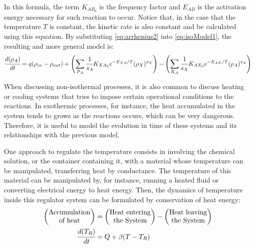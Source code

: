 \documentclass[a4paper,11pt]{book}
\numberwithin{figure}{chapter}
\numberwithin{equation}{chapter}
\numberwithin{table}{chapter}
\theoremstyle{definition}
\begin{document}
In this formula, the term $K_{AB_0}$ is the frequency factor and $E_{AB}$ is the activation energy necessary for such reaction to occur. Notice that, in the case that the temperature $T$ is constant, the kinetic rate is also constant and be calculated using this equation. By substituting \eqref{eq:arrhenius2} into \eqref{eq:isoModel1}, the resulting and more general model is:
\begin{equation} \label{eq:isoModel2}
		\cfrac{d (\rho_A)}{dt} = q (\rho_{in} - \rho_{out}) + \left( \sum_{\mathcal{P_A}} \cfrac{1}{s_A} K_{XA_0} e^{-E_{XA} / T} (\rho_X)^{s_{X}} \right) - \left(\sum_{\mathcal{R_A}} \cfrac{1}{s_X} K_{AX_0} e^{-E_{AX} / T} (\rho_A)^{s_{A}} \right)
\end{equation}

When discussing non-isothermal processes, it is also common to discuss heating or cooling systems that tries to impose certain operational conditions to the reactions. In exothermic processes, for instance, the heat accumulated in the system tends to grows as the reactions occurs, which can be very dangerous. Therefore, it is useful to model the evolution in time of these systems and its relationships with the previous model.

One approach to regulate the temperature consists in involving the chemical solution, or the container containing it, with a material whose temperature can be manipulated, transferring heat by conductance. The temperature of this material can be manipulated by, for instance, running a heated fluid or converting electrical energy to heat energy. Then, the dynamics of temperature inside this regulator system can be formulated by conservation of heat energy:
\begin{equation} \label{eq:jacket01}
\begin{split}
	\begin{pmatrix}
		\text{Accumulation} \\ \text{of heat}
	\end{pmatrix} &= \begin{pmatrix}
		\text{Heat entering} \\ \text{the System}
	\end{pmatrix} - \begin{pmatrix}
		\text{Heat leaving} \\ \text{the System}
	\end{pmatrix} \\
	\cfrac{d (T_R)}{dt} &= Q + \beta (T - T_R)
\end{split}
\end{equation}
\end{document}
